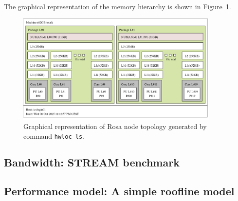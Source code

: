 The graphical representation of the memory hierarchy is shown in Figure~\ref{fig:memory_topology}.

\begin{figure}[h]
\centering
\includegraphics[width=0.9\textwidth]{../src/2-Performance-characteristics/02/XEON_E5-2650.png}
\caption{Graphical representation of Rosa node topology generated by command \texttt{hwloc-ls}.}
\label{fig:memory_topology}
\end{figure}

\subsection{Bandwidth: STREAM benchmark}


\subsection{Performance model: A simple roofline model}